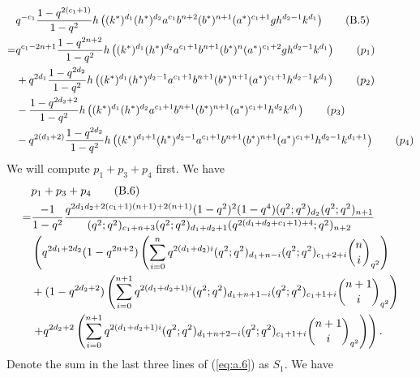 \documentclass[table,a4paper,reqno]{amsart}
\numberwithin{equation}{section}
\theoremstyle{definition}
\begin{document}
\begin{align}\stepcounter{equation}
    &q^{-c_1}\frac{1-q^{2(c_1+1)}}{1-q^2}h\left((k^*)^{d_1}(h^*)^{d_2}a^{c_1}b^{n+2}(b^*)^{n+1}(a^*)^{c_1+1}gh^{d_2-1}k^{d_1}\right)\tag{B.5}\\
    =&q^{c_1-2n+1}\frac{1-q^{2n+2}}{1-q^2}h\left((k^*)^{d_1}(h^*)^{d_2}a^{c_1+1}b^{n+1}(b^*)^{n}(a^*)^{c_1+2}gh^{d_2-1}k^{d_1}\right)\tag{$p_1$}\\
    &+q^{2d_1}\frac{1-q^{2d_2}}{1-q^2}h\left((k^*)^{d_1}(h^*)^{d_2-1}a^{c_1+1}b^{n+1}(b^*)^{n+1}(a^*)^{c_1+1}h^{d_2-1}k^{d_1}\right)\tag{$p_2$}\\
    &-\frac{1-q^{2d_2+2}}{1-q^2}h\left((k^*)^{d_1}(h^*)^{d_2}a^{c_1+1}b^{n+1}(b^*)^{n+1}(a^*)^{c_1+1}h^{d_2}k^{d_1}\right)\tag{$p_3$}\\
    &-q^{2(d_1+2)}\frac{1-q^{2d_2}}{1-q^2}h\left((k^*)^{d_1+1}(h^*)^{d_2-1}a^{c_1+1}b^{n+1}(b^*)^{n+1}(a^*)^{c_1+1}h^{d_2-1}k^{d_1+1}\right)\tag{$p_4$}
\end{align}
We will compute $p_1+p_3+p_4$ first. We have
\begin{align}\label{eq:a.6}\stepcounter{equation}
        &p_1+p_3+p_4\tag{B.6}\\
        =&\frac{-1}{1-q^2}\frac{q^{2d_1d_2+2(c_1+1)(n+1)+2(n+1)}(1-q^2)^2(1-q^4)(q^2;q^2)_{d_2}(q^2;q^2)_{n+1}}{(q^2;q^2)_{c_1+n+3}(q^2;q^2)_{d_1+d_2+1}(q^{2(d_1+d_2+c_1+1)+4};q^2)_{n+2}}\notag\\
        &\left(q^{2d_1+2d_2}(1-q^{2n+2})\left(\sum_{i=0}^{n}q^{2(d_1+d_2)i}(q^2;q^2)_{d_1+n-i}(q^2;q^2)_{c_1+2+i}{n\choose i}_{q^2}\right)\right.\notag\\
        &+(1-q^{2d_2+2})\left(\sum_{i=0}^{n+1}q^{2(d_1+d_2+1)i}(q^2;q^2)_{d_1+n+1-i}(q^2;q^2)_{c_1+1+i}{n+1\choose i}_{q^2}\right)\notag\\
        &\left.+q^{2d_2+2}\left(\sum_{i=0}^{n+1}q^{2(d_1+d_2+1)i}(q^2;q^2)_{d_1+n+2-i}(q^2;q^2)_{c_1+1+i}{n+1\choose i}_{q^2}\right)\right).\notag
\end{align}
Denote the sum in the last three lines of (\ref{eq:a.6}) as $S_1$. We have
\end{document}
